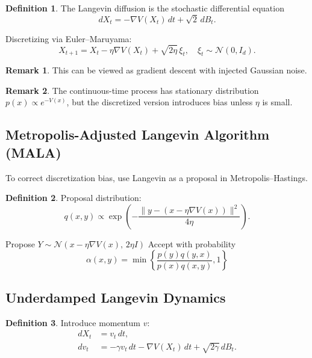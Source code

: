 \documentclass[12pt,oneside]{book}
\numberwithin{equation}{section}
\theoremstyle{definition}
\newtheorem{definition}{Definition}[section]
\newtheorem{remark}{Remark}[section]
\theoremstyle{plain}
\theoremstyle{remark}
\newcommand{\Normal}{\mathcal{N}}
\begin{document}
\begin{definition}
The Langevin diffusion is the stochastic differential equation
\[
dX_t = -\nabla V(X_t)\,dt + \sqrt{2}\,dB_t.
\]
\end{definition}

Discretizing via Euler--Maruyama:
\[
X_{t+1} = X_t - \eta \nabla V(X_t) + \sqrt{2\eta}\,\xi_t,
\quad \xi_t \sim \Normal(0,I_d).
\]

\begin{remark}
This can be viewed as gradient descent with injected Gaussian noise.
\end{remark}

\begin{remark}
The continuous-time process has stationary distribution $p(x) \propto e^{-V(x)}$, but the discretized version introduces bias unless $\eta$ is small.
\end{remark}


\subsection*{Metropolis-Adjusted Langevin Algorithm (MALA)}

To correct discretization bias, use Langevin as a proposal in Metropolis--Hastings.

\begin{definition}
Proposal distribution:
\[
q(x,y)
\propto
\exp\left(
-\frac{\|y - (x - \eta \nabla V(x))\|^2}{4\eta}
\right).
\]
\end{definition}

\begin{algorithm}
\caption{MALA}
\begin{algorithmic}
\State Propose $Y \sim \Normal(x - \eta \nabla V(x),\, 2\eta I)$
\State Accept with probability
\[
\alpha(x,y)
=
\min\left\{
\frac{p(y)q(y,x)}{p(x)q(x,y)}, 1
\right\}
\]
\end{algorithmic}
\end{algorithm}


\subsection*{Underdamped Langevin Dynamics}

\begin{definition}
Introduce momentum $v$:
\[
\begin{aligned}
dX_t &= v_t\,dt, \\
dv_t &= -\gamma v_t\,dt - \nabla V(X_t)\,dt + \sqrt{2\gamma}\,dB_t.
\end{aligned}
\]
\end{definition}
\end{document}
